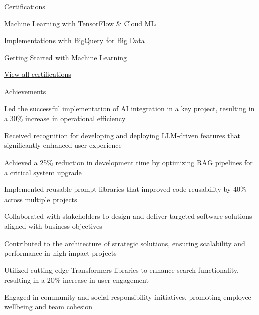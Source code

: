 \documentclass{resume} %
\begin{document}
    \begin{rSection}{Certifications}
        \begin{rSubsection}{}{}{}
                            \item Machine Learning with TensorFlow \& Cloud ML
                            \item Implementations with BigQuery for Big Data
                            \item Getting Started with Machine Learning
                    \end{rSubsection}
        \href{https://skillsoft.digitalbadges.skillsoft.com/profile/umairsaeed185770/wallet}{View all certifications}
    \end{rSection}

    \begin{rSection}{Achievements}
        \begin{rSubsection}{}{}{}
                            \item Led the successful implementation of AI integration in a key project, resulting in a 30\% increase in operational efficiency
                            \item Received recognition for developing and deploying LLM{-}driven features that significantly enhanced user experience
                            \item Achieved a 25\% reduction in development time by optimizing RAG pipelines for a critical system upgrade
                            \item Implemented reusable prompt libraries that improved code reusability by 40\% across multiple projects
                            \item Collaborated with stakeholders to design and deliver targeted software solutions aligned with business objectives
                            \item Contributed to the architecture of strategic solutions, ensuring scalability and performance in high{-}impact projects
                            \item Utilized cutting{-}edge Transformers libraries to enhance search functionality, resulting in a 20\% increase in user engagement
                            \item Engaged in community and social responsibility initiatives, promoting employee wellbeing and team cohesion
                    \end{rSubsection}
    \end{rSection}
\end{document}
